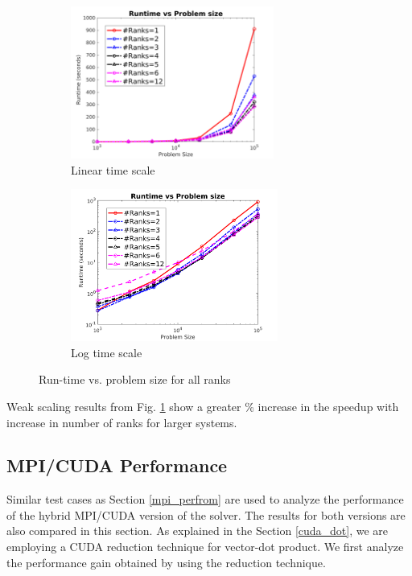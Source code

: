 \documentclass[sigplan,screen]{acmart}
\begin{document}
\begin{figure}
	\begin{subfigure}{0.3\textwidth}
		\includegraphics[trim= 10 5 35 10,clip, width=0.95\linewidth, height=5cm]{plots/MPI_weak_allrank.png} 
		\caption{Linear time scale}
	\end{subfigure}
	\begin{subfigure}{0.3\textwidth}
		\includegraphics[trim= 10 5 35 10,clip, width=0.95\linewidth, height=5cm]{plots/MPI_weak_allrank_loglog.png}
		\caption{Log time scale}
	\end{subfigure}
	\caption{Run-time vs. problem size for all ranks}
	\label{weak}
\end{figure}

\noindent Weak scaling results from Fig. \ref{weak} show a greater \% increase in the speedup with increase in number of ranks for larger systems. 

\subsection{MPI/CUDA Performance}
Similar test cases as Section \ref{mpi_perfrom} are used to analyze the performance of the hybrid MPI/CUDA version of the solver. The results for both versions are also compared in this section. As explained in the Section \ref{cuda_dot}, we are employing a CUDA reduction technique for vector-dot product. We first analyze the performance gain obtained by using the reduction technique. 
\end{document}
